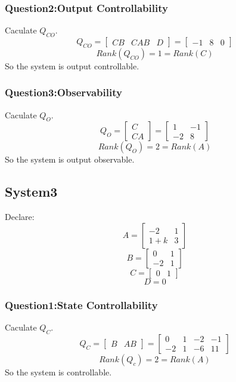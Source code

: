 \documentclass[12pt,a4paper,oneside]{ctexart}
\begin{document}
            \subsubsection{Question2:Output Controllability}
                Caculate $Q_{CO}$.
                $$Q_{CO} = \begin{bmatrix}
                    CB&CAB&D
                \end{bmatrix} = \begin{bmatrix}
                    -1&8&0
                \end{bmatrix}$$
                $$Rank(Q_{CO})=1=Rank(C)$$
                So the system is output controllable.
                
            \subsubsection{Question3:Observability}
                Caculate $Q_{O}$.
                $$Q_{O} = \begin{bmatrix}
                    C\\
                    CA
                \end{bmatrix} = \begin{bmatrix}
                    1&-1\\
                    -2&8
                \end{bmatrix}$$
                $$Rank(Q_{O})=2=Rank(A)$$
                So the system is output observable.

        \subsection{System3}
        Declare:
            $$
            A=\begin{bmatrix}
                -2&1\\
                1+k&3
            \end{bmatrix}
            $$
            $$
            B=\begin{bmatrix}
                0&1\\
                -2&1
            \end{bmatrix}
            $$
            $$
            C=\begin{bmatrix}
                0&1
            \end{bmatrix}
            $$
            $$
            D=0
            $$
            \subsubsection{Question1:State Controllability}
                Caculate $Q_C$.
                $$Q_C = \begin{bmatrix}
                    B&AB
                \end{bmatrix} = \begin{bmatrix}
                    0&1&-2&-1\\
                    -2&1&-6&11
                \end{bmatrix}$$
                $$Rank(Q_c)=2=Rank(A)$$
                So the system is controllable.
\end{document}
